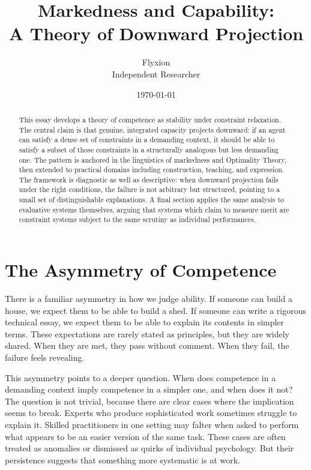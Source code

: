 \documentclass[12pt, a4paper]{article}
\title{\textbf{Markedness and Capability:\\A Theory of Downward Projection}}
\author{Flyxion\\[0.5em]\small Independent Researcher}
\date{\today}
\begin{document}
\maketitle
\thispagestyle{empty}

\vspace{1em}

\begin{abstract}
\noindent This essay develops a theory of competence as stability under constraint relaxation. The central claim is that genuine, integrated capacity projects downward: if an agent can satisfy a dense set of constraints in a demanding context, it should be able to satisfy a subset of those constraints in a structurally analogous but less demanding one. The pattern is anchored in the linguistics of markedness and Optimality Theory, then extended to practical domains including construction, teaching, and expression. The framework is diagnostic as well as descriptive: when downward projection fails under the right conditions, the failure is not arbitrary but structured, pointing to a small set of distinguishable explanations. A final section applies the same analysis to evaluative systems themselves, arguing that systems which claim to measure merit are constraint systems subject to the same scrutiny as individual performances.
\end{abstract}

\newpage

\section{The Asymmetry of Competence}

There is a familiar asymmetry in how we judge ability. If someone can build a house, we expect them to be able to build a shed. If someone can write a rigorous technical essay, we expect them to be able to explain its contents in simpler terms. These expectations are rarely stated as principles, but they are widely shared. When they are met, they pass without comment. When they fail, the failure feels revealing.

This asymmetry points to a deeper question. When does competence in a demanding context imply competence in a simpler one, and when does it not? The question is not trivial, because there are clear cases where the implication seems to break. Experts who produce sophisticated work sometimes struggle to explain it. Skilled practitioners in one setting may falter when asked to perform what appears to be an easier version of the same task. These cases are often treated as anomalies or dismissed as quirks of individual psychology. But their persistence suggests that something more systematic is at work.
\end{document}
